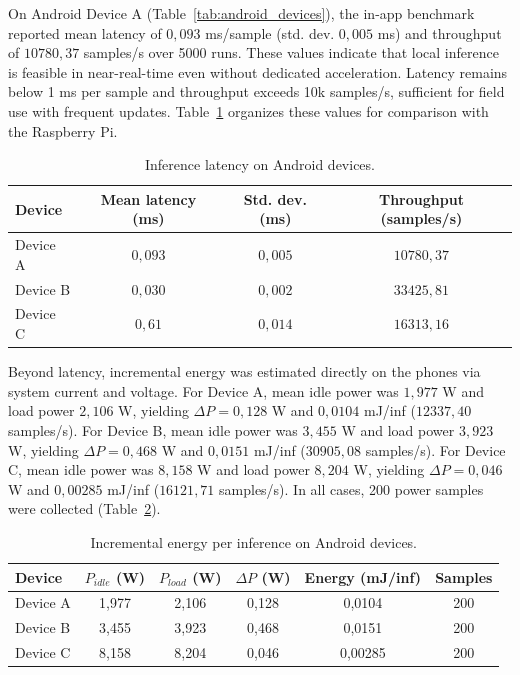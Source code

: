 On Android Device A (Table~\ref{tab:android_devices}), the in-app benchmark reported mean
latency of $0{,}093$ ms/sample (std. dev. $0{,}005$ ms) and throughput of $10780{,}37$
samples/s over 5000 runs. These values indicate that local inference is feasible in
near-real-time even without dedicated acceleration. Latency remains below 1 ms per
sample and throughput exceeds 10k samples/s, sufficient for field use with frequent
updates. Table~\ref{tab:latency_android} organizes these values for comparison with
the Raspberry Pi.

\begin{table}[ht!]
\centering
\caption{Inference latency on Android devices.}
\begin{tabular}{lccc}
\toprule
Device & Mean latency (ms) & Std. dev. (ms) & Throughput (samples/s) \\
\midrule
Device A & $0{,}093$ & $0{,}005$ & $10780{,}37$ \\
Device B & $0{,}030$ & $0{,}002$ & $33425{,}81$ \\
Device C & $0{,}61$ & $0{,}014$ & $16313{,}16$ \\
\bottomrule
\end{tabular}
\label{tab:latency_android}
\end{table}

Beyond latency, incremental energy was estimated directly on the phones via system current
and voltage. For Device A, mean idle power was $1{,}977$ W and load power $2{,}106$ W,
yielding $\Delta P = 0{,}128$ W and $0{,}0104$ mJ/inf ($12337{,}40$ samples/s). For Device B,
mean idle power was $3{,}455$ W and load power $3{,}923$ W, yielding $\Delta P = 0{,}468$ W
and $0{,}0151$ mJ/inf ($30905{,}08$ samples/s). For Device C, mean idle power was $8{,}158$ W
and load power $8{,}204$ W, yielding $\Delta P = 0{,}046$ W and $0{,}00285$ mJ/inf
($16121{,}71$ samples/s). In all cases, 200 power samples were collected
(Table~\ref{tab:energy_android}).

\begin{table}[ht!]
\centering
\caption{Incremental energy per inference on Android devices.}
\begin{tabular}{lccccc}
\toprule
Device & $P_{idle}$ (W) & $P_{load}$ (W) & $\Delta P$ (W) & Energy (mJ/inf) & Samples \\
\midrule
Device A & 1{,}977 & 2{,}106 & 0{,}128 & 0{,}0104 & 200 \\
Device B & 3{,}455 & 3{,}923 & 0{,}468 & 0{,}0151 & 200 \\
Device C & 8{,}158 & 8{,}204 & 0{,}046 & 0{,}00285 & 200 \\
\bottomrule
\end{tabular}
\label{tab:energy_android}
\end{table}

